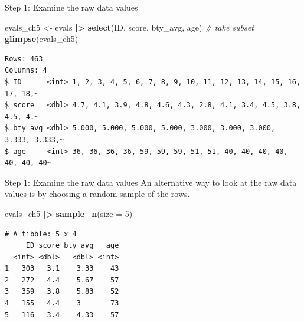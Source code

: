 \documentclass[
  ignorenonframetext,
]{beamer}
\newenvironment{Shaded}{\begin{snugshade}}{\end{snugshade}}
\newcommand{\AttributeTok}[1]{\textcolor[rgb]{0.13,0.29,0.53}{#1}}
\newcommand{\CommentTok}[1]{\textcolor[rgb]{0.56,0.35,0.01}{\textit{#1}}}
\newcommand{\DecValTok}[1]{\textcolor[rgb]{0.00,0.00,0.81}{#1}}
\newcommand{\FunctionTok}[1]{\textcolor[rgb]{0.13,0.29,0.53}{\textbf{#1}}}
\newcommand{\NormalTok}[1]{#1}
\newcommand{\OtherTok}[1]{\textcolor[rgb]{0.56,0.35,0.01}{#1}}
\newcommand{\SpecialCharTok}[1]{\textcolor[rgb]{0.81,0.36,0.00}{\textbf{#1}}}
\begin{document}
\begin{frame}[fragile]{Step 1: Examine the raw data values}
\label{step-1-examine-the-raw-data-values}
\normalsize

\begin{Shaded}
\begin{Highlighting}[]
\NormalTok{evals\_ch5 }\OtherTok{\textless{}{-}}\NormalTok{ evals }\SpecialCharTok{|\textgreater{}}
  \FunctionTok{select}\NormalTok{(ID, score, bty\_avg, age)   }\CommentTok{\# take subset}
\FunctionTok{glimpse}\NormalTok{(evals\_ch5)}
\end{Highlighting}
\end{Shaded}

\begin{verbatim}
Rows: 463
Columns: 4
$ ID      <int> 1, 2, 3, 4, 5, 6, 7, 8, 9, 10, 11, 12, 13, 14, 15, 16, 17, 18,~
$ score   <dbl> 4.7, 4.1, 3.9, 4.8, 4.6, 4.3, 2.8, 4.1, 3.4, 4.5, 3.8, 4.5, 4.~
$ bty_avg <dbl> 5.000, 5.000, 5.000, 5.000, 3.000, 3.000, 3.000, 3.333, 3.333,~
$ age     <int> 36, 36, 36, 36, 59, 59, 59, 51, 51, 40, 40, 40, 40, 40, 40, 40~
\end{verbatim}

\normalsize
\end{frame}

\begin{frame}[fragile]{Step 1: Examine the raw data values}
\label{step-1-examine-the-raw-data-values-1}
An alternative way to look at the raw data values is by choosing a
random sample of the rows.

\normalsize

\begin{Shaded}
\begin{Highlighting}[]
\NormalTok{evals\_ch5 }\SpecialCharTok{|\textgreater{}}
  \FunctionTok{sample\_n}\NormalTok{(}\AttributeTok{size =} \DecValTok{5}\NormalTok{)}
\end{Highlighting}
\end{Shaded}

\begin{verbatim}
# A tibble: 5 x 4
     ID score bty_avg   age
  <int> <dbl>   <dbl> <int>
1   303   3.1    3.33    43
2   272   4.4    5.67    57
3   359   3.8    5.83    52
4   155   4.4    3       73
5   116   3.4    4.33    57
\end{verbatim}

\normalsize
\end{frame}
\end{document}
